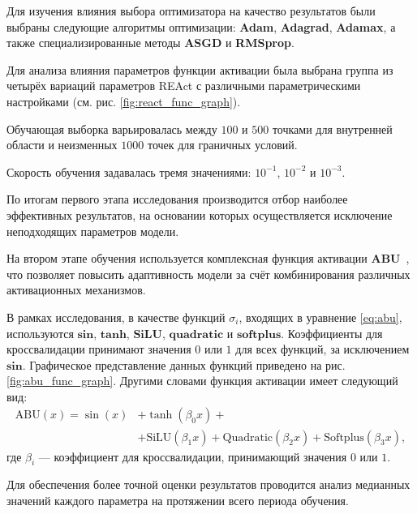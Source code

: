 Для изучения влияния выбора оптимизатора на качество результатов были выбраны
следующие алгоритмы оптимизации: \textbf{Adam}, \textbf{Adagrad}, \textbf{Adamax},
а также специализированные методы \textbf{ASGD} и \textbf{RMSprop}.

Для анализа влияния параметров функции активации была выбрана группа из четырёх вариаций параметров
REAct с различными параметрическими настройками (см. рис. \ref{fig:react_func_graph}).


Обучающая выборка варьировалась между $100$ и $500$ точками для внутренней
области и неизменных $1000$ точек для граничных условий. 

Скорость обучения задавалась тремя значениями: $10^{-1}$, $10^{-2}$ и $10^{-3}$.

По итогам первого этапа исследования производится отбор наиболее эффективных результатов,
на основании которых осуществляется исключение неподходящих параметров модели.



На втором этапе обучения используется комплексная функция активации
\textbf{ABU}~\cite{Sutfeld2018-io}, что позволяет повысить адаптивность модели за счёт
комбинирования различных активационных механизмов.

В рамках исследования, в качестве функций $\sigma_i$, входящих в уравнение \eqref{eq:abu},
используются $\mathbf{sin}$, $\mathbf{tanh}$, $\mathbf{SiLU}$, $\mathbf{quadratic}$ и
$\mathbf{softplus}$. Коэффициенты для кроссвалидации принимают значения $0$ или $1$ для всех
функций, за исключением $\mathbf{sin}$. Графическое представление данных функций приведено
на рис. \ref{fig:abu_func_graph}.
Другими словами функция активации имеет следующий вид:
\begin{equation}
    \begin{split}
        \text{ABU}(x) = \sin(x) &+ \tanh(\beta_0 x) + \\
        &+ \text{SiLU}(\beta_1 x) + \text{Quadratic}(\beta_2 x) + \text{Softplus}(\beta_3 x),
    \end{split}
    \label{eq:abu_custom}
\end{equation}
где $\beta_i$ --- коэффициент для кроссвалидации,  принимающий значения $0$ или $1$.


Для обеспечения более точной оценки результатов проводится анализ медианных значений каждого
параметра на протяжении всего периода обучения.